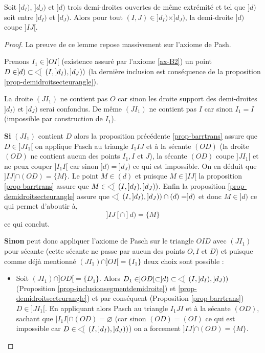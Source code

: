 \begin{lem}\label{lem-barrtrans}
    Soit $]d_I)$, $]d_J)$ et $]d)$ trois demi-droites ouvertes de même extrémité et tel que $]d)$ soit entre $]d_I)$ et $]d_J)$. Alors pour tout $(I,J)\in ]d_I)\times]d_J)$, la demi-droite $]d)$ coupe $]IJ[$.
    \begin{proof}
        La preuve de ce lemme repose massivement sur l'axiome de Pash.

        Prenons $I_1 \in ]OI[$ (existence assuré par l'axiome \ref{ax-B2}) un point $D\in ]d)\subset \anglesaillant\left(I,]d_I),]d_J)\right)$ (la dernière inclusion est conséquence de la proposition \ref{prop-demidroitsecteurangle}). 

        La droite $(JI_1)$ ne contient pas $O$ car sinon les droite support des demi-droites $]d_I)$ et $]d_J)$ serai confondus. De même $(J I_1)$ ne contient pas $I$ car sinon $I_1 = I$ (impossible par construction de $I_1$). 
        
        \textbf{Si} $(JI_1)$ contient $D$ alors la proposition précédente \ref{prop-barrtrans} assure que $D\in]JI_1[$ on applique Pasch au triangle $I_1 I J$ et à la sécante $(OD)$ (la droite $(OD)$ ne contient aucun des points $I_1, I$ et $J$), la sécante $(OD)$ coupe $]JI_1[$ et ne peux couper $]I_1 I[$ car sinon $]d)=]d_J)$ ce qui est impossible. On en déduit que $]IJ[\cap (OD)=\{M\}$. Le point $M\in (d)$ et puisque $M\in ]IJ[$ la proposition \ref{prop-barrtrans} assure que $M\in \anglesaillant\left(I,]d_I),]d_J)\right)$. Enfin la proposition \ref{prop-demidroitsecteurangle} assure que $\anglesaillant\left(I,]d_I),]d_J)\right) \cap (d) = ]d)$ et donc $M\in ]d)$ ce qui permet d'aboutir à,
        \begin{equation*}
            ]IJ[\cap ]d) =\{M\}
        \end{equation*}
        ce qui conclut.

        \textbf{Sinon} peut donc appliquer l'axiome de Pasch sur le triangle $OID$ avec $(JI_1)$ pour sécante (cette sécante ne passe par aucun des points $O,I$ et $D$) et puisque comme déjà mentionné $(JI_1)\cap ]OI[=\{I_1\}$ deux choix sont possible : 
        \begin{itemize}[$\bullet$]
            \item Soit $(JI_1)\cap ]OD[=\{D_1\}$. Alors $D_1 \in ]OD[\subset ]d) \subset \anglesaillant\left(I,]d_I),]d_J)\right)$ (Proposition \ref{prop-inclusionsegmentdemidroite}) et \ref{prop-demidroitsecteurangle}) et par conséquent (Proposition \ref{prop-barrtrans}) $D\in]JI_1[$. En appliquant alors Pasch au triangle $I_1JI$ et à la sécante $(OD)$, sachant que $]I_1 I[\cap (OD)=\varnothing$ (car sinon $(OD)=(OI)$ ce qui est impossible car $D\in \anglesaillant\left(I,]d_I),]d_J)\right)$) on a forcement $]IJ[\cap (OD)=\{M\}$. 
            

\end{itemize}
\end{proof}
\end{lem}
